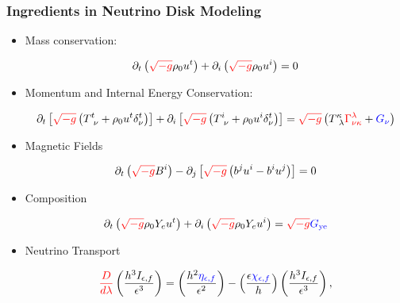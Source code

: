 \documentclass[]{beamer}
\newcommand{\paren}[1]{\left( #1 \right)}
\newcommand{\sqrbrace}[1]{\left[ #1 \right]}
\newcommand{\detg}{\sqrt{-g}}
\newcommand{\eepsilon}{\epsilon} %
\newcommand{\etanuf}{\eta_{\eepsilon,f}}
\newcommand{\Inuf}{I_{\eepsilon,f}}
\newcommand{\chinuf}{\chi_{\eepsilon,f}}
\begin{document}
\begin{frame}
  \frametitle{Ingredients in Neutrino Disk Modeling}
  \begin{itemize}
  \item Mass conservation:
    \begin{small}
      \begin{displaymath}
        \partial_t \paren{{\color{red}\detg}\rho_0 u^t}
        + \partial_i\paren{{\color{red}\detg}\rho_0u^i} = 0
      \end{displaymath}
    \end{small}
  \item Momentum and Internal Energy Conservation:
    \begin{small}
      \begin{displaymath}
        \partial_t\sqrbrace{{\color{red}\detg} \paren{T^t_{\ \nu} + \rho_0u^t \delta^t_\nu}}
        + \partial_i\sqrbrace{{\color{red}\detg}\paren{T^i_{\ \nu} + \rho_0 u^i \delta^t_\nu}}
        = {\color{red}\detg} \paren{T^\kappa_{\ \lambda} {\color{red}\Gamma^\lambda_{\nu\kappa}} + {\color{blue}G_\nu}}
      \end{displaymath}
    \end{small}
  \item Magnetic Fields
    \begin{small}
      \begin{displaymath}
        \partial_t \paren{{\color{red}\detg} B^i}
        - \partial_j \sqrbrace{{\color{red}\detg}\paren{b^ju^i - b^i u^j}}
        = 0
      \end{displaymath}
    \end{small}
  \item Composition
    \begin{small}
      \begin{displaymath}
        \partial_t\paren{{\color{red}\detg}\rho_0 Y_e u^t}
        + \partial_i\paren{{\color{red}\detg}\rho_0Y_eu^i}
        = {\color{red}\detg} {\color{blue}G_{\text{ye}}}
      \end{displaymath}
    \end{small}
  \item Neutrino Transport
    \begin{small}
      \begin{displaymath}
        {\color{red}\frac{D}{d\lambda}}\paren{\frac{h^3\Inuf}{\eepsilon^3}}
        = \paren{\frac{h^2{\color{blue}\etanuf}}{\eepsilon^2}}
        - \paren{\frac{\eepsilon {\color{blue}\chinuf}}{h}} \paren{\frac{h^3\Inuf}{\eepsilon^3}},
      \end{displaymath}
    \end{small}
  \end{itemize}
\end{frame}
\end{document}
